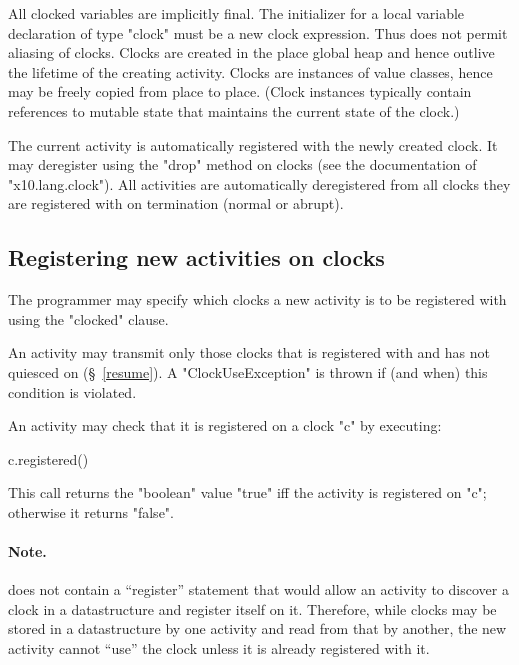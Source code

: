 All clocked variables are implicitly final. The initializer for a
local variable declaration of type \xcd"clock" must be a new clock
expression. Thus \Xten{} does not permit aliasing of clocks.
Clocks are created in the place global heap and hence outlive the
lifetime of the creating activity.  Clocks are instances of value
classes, hence may be freely copied from place to
place. (Clock instances typically contain references to mutable state
that maintains the current state of the clock.)

The current activity is automatically registered with the newly
created clock.  It may deregister using the \xcd"drop" method on
clocks (see the documentation of \xcd"x10.lang.clock"). All activities
are automatically deregistered from all clocks they are registered
with on termination (normal or abrupt).

\subsection{Registering new activities on clocks}
\label{sec:clock:register}

The programmer may specify which clocks a new activity is to be
registered with using the \xcd"clocked" clause.

An activity may transmit only those clocks that is registered with and
has not quiesced on (\S~\ref{resume}). 
A \xcd"ClockUseException" is
thrown if (and when) this condition is violated.

An activity may check that it is registered on a clock \xcd"c" by
executing:
\begin{xten}
c.registered()
\end{xten}
\noindent This call returns the \xcd"boolean" value \xcd"true" iff the
activity is registered on \xcd"c"; otherwise it returns \xcd"false".

\paragraph{Note.} 
\Xten{} does not contain a ``register'' statement that would allow an
activity to discover a clock in a datastructure and register itself on
it. Therefore, while clocks may be stored in a datastructure by one
activity and read from that by another, the new activity cannot
``use'' the clock unless it is already registered with it.


